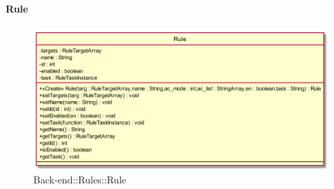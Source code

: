 \hypertarget{Rule_label}{\paragraph{Rule}}
\begin{figure}[h]
	\centering
	\includegraphics[width=\textwidth,height=\textheight,keepaspectratio]{images/ClassRule.png}
	\caption{Back-end::Rules::Rule}
\end{figure}

